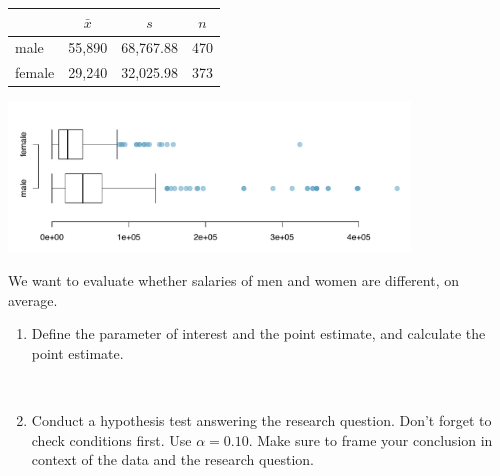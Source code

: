 \documentclass[12pt]{article}
\newcommand{\soln}[2]{$\:$\\ \vspace{#1}}{}
\begin{document}
\begin{enumerate}
\begin{center}
%
{\small
\begin{tabular}{lccc}
\hline
			& $\bar{x}$ 	& $s$	& $n$ \\
\hline
male			& 55,890		& 68,767.88	& 470 \\
female		& 29,240		& 32,025.98	& 373 \\
\hline
\end{tabular}
}
%
\includegraphics[width=0.8\textwidth]{figures/acs/sal_gen_box}
\end{center}
We want to evaluate whether salaries of men and women are different, on average.

\begin{enumerate}

\item Define the parameter of interest and the point estimate, and calculate the point estimate.

\soln{5cm}{Parameter: Difference in average salaries of all US males and females. \\
Statistic: Difference in average salaries of sampled males and females.
}

\item Conduct a hypothesis test answering the research question. Don't forget to check conditions first. Use 
$\alpha = 0.10$. Make sure to frame your conclusion in context of the data and the research question.

\soln{5cm}{
$H_0: \mu_{m} - \mu_{f} = 0$ \\
$H_A: \mu_{m} - \mu_{f} \ne 0$ \\
Conditions:
\begin{enumerate}
\item Independence: The individuals are randomly sampled and are less than 10\% of their respective populations.
\item Skew: The distributions are likely right skewed, but we have large sample sizes.
\end{enumerate}
Hence we can assume that the sampling distribution of the average difference in salaries of males and females
are independent of each other. \\
$T_{371} = \frac{(55,890 - 29,240) - 0}{\sqrt{\frac{68,767.88^2}{470} + \frac{32,025.98^2}{373}}} = \frac{26,650}{3,579.318} = 7.45$ \\
p-value < 0.01 $\rightarrow$ Reject $H_0$, the data provide convincing evidence of a difference in salaries of males and females.
}


\end{enumerate}
\end{enumerate}
\end{document}
